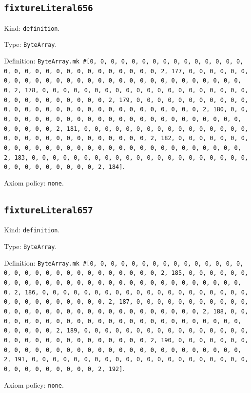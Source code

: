 \documentclass[11pt]{article}
\begin{document}
\subsection*{\texttt{fixtureLiteral656}}
\noindent Kind: \texttt{definition}.\par
\noindent Type: \texttt{ByteArray}.\par
\noindent Definition: \texttt{ByteArray.mk \#[0, 0, 0, 0, 0, 0, 0, 0, 0, 0, 0, 0, 0, 0, 0, 0, 0, 0, 0, 0, 0, 0, 0, 0, 0, 0, 0, 0, 0, 0, 2, 177, 0, 0, 0, 0, 0, 0, 0, 0, 0, 0, 0, 0, 0, 0, 0, 0, 0, 0, 0, 0, 0, 0, 0, 0, 0, 0, 0, 0, 0, 0, 2, 178, 0, 0, 0, 0, 0, 0, 0, 0, 0, 0, 0, 0, 0, 0, 0, 0, 0, 0, 0, 0, 0, 0, 0, 0, 0, 0, 0, 0, 0, 0, 2, 179, 0, 0, 0, 0, 0, 0, 0, 0, 0, 0, 0, 0, 0, 0, 0, 0, 0, 0, 0, 0, 0, 0, 0, 0, 0, 0, 0, 0, 0, 0, 2, 180, 0, 0, 0, 0, 0, 0, 0, 0, 0, 0, 0, 0, 0, 0, 0, 0, 0, 0, 0, 0, 0, 0, 0, 0, 0, 0, 0, 0, 0, 0, 2, 181, 0, 0, 0, 0, 0, 0, 0, 0, 0, 0, 0, 0, 0, 0, 0, 0, 0, 0, 0, 0, 0, 0, 0, 0, 0, 0, 0, 0, 0, 0, 2, 182, 0, 0, 0, 0, 0, 0, 0, 0, 0, 0, 0, 0, 0, 0, 0, 0, 0, 0, 0, 0, 0, 0, 0, 0, 0, 0, 0, 0, 0, 0, 2, 183, 0, 0, 0, 0, 0, 0, 0, 0, 0, 0, 0, 0, 0, 0, 0, 0, 0, 0, 0, 0, 0, 0, 0, 0, 0, 0, 0, 0, 0, 0, 2, 184]}.\par
\noindent Axiom policy: \texttt{none}.\par
\subsection*{\texttt{fixtureLiteral657}}
\noindent Kind: \texttt{definition}.\par
\noindent Type: \texttt{ByteArray}.\par
\noindent Definition: \texttt{ByteArray.mk \#[0, 0, 0, 0, 0, 0, 0, 0, 0, 0, 0, 0, 0, 0, 0, 0, 0, 0, 0, 0, 0, 0, 0, 0, 0, 0, 0, 0, 0, 0, 2, 185, 0, 0, 0, 0, 0, 0, 0, 0, 0, 0, 0, 0, 0, 0, 0, 0, 0, 0, 0, 0, 0, 0, 0, 0, 0, 0, 0, 0, 0, 0, 2, 186, 0, 0, 0, 0, 0, 0, 0, 0, 0, 0, 0, 0, 0, 0, 0, 0, 0, 0, 0, 0, 0, 0, 0, 0, 0, 0, 0, 0, 0, 0, 2, 187, 0, 0, 0, 0, 0, 0, 0, 0, 0, 0, 0, 0, 0, 0, 0, 0, 0, 0, 0, 0, 0, 0, 0, 0, 0, 0, 0, 0, 0, 0, 2, 188, 0, 0, 0, 0, 0, 0, 0, 0, 0, 0, 0, 0, 0, 0, 0, 0, 0, 0, 0, 0, 0, 0, 0, 0, 0, 0, 0, 0, 0, 0, 2, 189, 0, 0, 0, 0, 0, 0, 0, 0, 0, 0, 0, 0, 0, 0, 0, 0, 0, 0, 0, 0, 0, 0, 0, 0, 0, 0, 0, 0, 0, 0, 2, 190, 0, 0, 0, 0, 0, 0, 0, 0, 0, 0, 0, 0, 0, 0, 0, 0, 0, 0, 0, 0, 0, 0, 0, 0, 0, 0, 0, 0, 0, 0, 2, 191, 0, 0, 0, 0, 0, 0, 0, 0, 0, 0, 0, 0, 0, 0, 0, 0, 0, 0, 0, 0, 0, 0, 0, 0, 0, 0, 0, 0, 0, 0, 2, 192]}.\par
\noindent Axiom policy: \texttt{none}.\par
\end{document}
